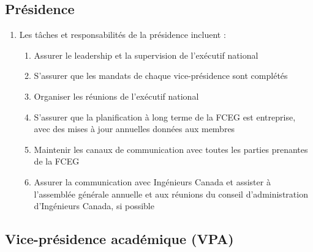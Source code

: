 \subsection{Présidence}
\label{executif-national-presidence}

\begin{enumerate}
 \item Les tâches et responsabilités de la présidence incluent :
  \begin{enumerate}
   \item Assurer le leadership et la supervision de l'exécutif national
   \item S'assurer que les mandats de chaque vice-présidence sont complétés
   \item Organiser les réunions de l'exécutif national
   \item S'assurer que la planification à long terme de la FCEG est entreprise, avec des mises à jour annuelles données aux membres
   \item Maintenir les canaux de communication avec toutes les parties prenantes de la FCEG
   \item Assurer la communication avec Ingénieurs Canada et assister à l'assemblée générale annuelle et aux réunions du conseil d'administration d'Ingénieurs Canada, si possible
  \end{enumerate}
\end{enumerate}

\subsection{Vice-présidence académique (VPA)}
\label{executif-national-vice-presidence-academique-vpa}

